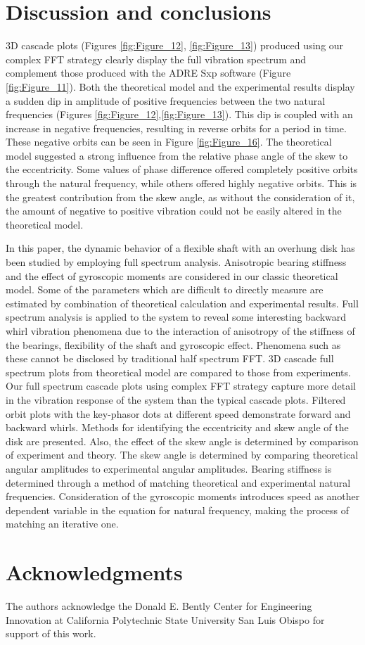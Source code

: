 	\section{Discussion and conclusions}
		3D cascade plots (Figures \ref{fig:Figure_12}, \ref{fig:Figure_13}) produced using our complex FFT strategy clearly display the full vibration spectrum and complement those produced with the ADRE Sxp software (Figure \ref{fig:Figure_11}). Both the theoretical model and the experimental results display a sudden dip in amplitude of positive frequencies between the two natural frequencies (Figures \ref{fig:Figure_12},\ref{fig:Figure_13}). This dip is coupled with an increase in negative frequencies, resulting in reverse orbits for a period in time. These negative orbits can be seen in Figure \ref{fig:Figure_16}. The theoretical model suggested a strong influence from the relative phase angle of the skew to the eccentricity. Some values of phase difference offered completely positive orbits through the natural frequency, while others offered highly negative orbits. This is the greatest contribution from the skew angle, as without the consideration of it, the amount of negative to positive vibration could not be easily altered in the theoretical model.\par 
		In this paper, the dynamic behavior of a flexible shaft with an overhung disk has been studied by employing full spectrum analysis. Anisotropic bearing stiffness and the effect of gyroscopic moments are considered in our classic theoretical model. Some of the parameters which are difficult to directly measure are estimated by combination of theoretical calculation and experimental results. Full spectrum analysis is applied to the system to reveal some interesting backward whirl vibration phenomena due to the interaction of anisotropy of the stiffness of the bearings, flexibility of the shaft and gyroscopic effect. Phenomena such as these cannot be disclosed by traditional half spectrum FFT. 3D cascade full spectrum plots from theoretical model are compared to those from experiments. Our full spectrum cascade plots using complex FFT strategy capture more detail in the vibration response of the system than the typical cascade plots. Filtered orbit plots with the key-phasor dots at different speed demonstrate forward and backward whirls. Methods for identifying the eccentricity and skew angle of the disk are presented. Also, the effect of the skew angle is determined by comparison of experiment and theory. The skew angle is determined by comparing theoretical angular amplitudes to experimental angular amplitudes. Bearing stiffness is determined through a method of matching theoretical and experimental natural frequencies. Consideration of the gyroscopic moments introduces speed as another dependent variable in the equation for natural frequency, making the process of matching an iterative one.\par 
	\section{Acknowledgments}
		The authors acknowledge the Donald E. Bently Center for Engineering Innovation at California Polytechnic State University San Luis Obispo for support of this work.\par 